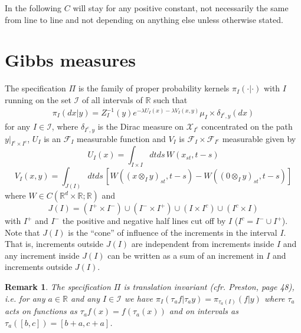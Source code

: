\documentclass[a4paper,12pt,reqno]{amsart}
\newtheorem{remark}[theorem]{Remark}
\newcommand{\R}{\mathbb{R}}
\newcommand{\I}{\mathcal{I}}
\newcommand{\X}{\mathcal{X}}
\newcommand{\F}{\mathcal{F}}
\begin{document}
In the following $C$ will stay for any positive constant, not necessarily the same from line to line and not depending on anything else unless otherwise stated.


\section{Gibbs measures}
\label{sec:existence}
The specification $\Pi$ is the family of proper probability kernels
$\pi_I(\cdot|\cdot)$ with $I$ running on the set $\I$ of all intervals of $\R$ such
that
\begin{equation}
  \begin{split}
\pi_I(dx|y) = Z_{I}^{-1}(y) e^{-\lambda U_{I}(x) -\lambda V_{I}(x,y)} \mu_I\times \delta_{I^c,y}(dx)   
  \end{split}
\end{equation}
for any $I \in \I$,
where $\delta_{I^c,y}$ is the Dirac measure on $\X_{I^c}$
concentrated on the path $y|_{I^c\times I^c}$, $U_I$ is an $\F_I$
measurable function and $V_I$ is $\F_I \times \F_{I^c}$ measurable
given by
\begin{equation}
\label{eq:def-U}
U_I(x) = \int_{I\times I} dt  ds \, W(x_{st},t-s)  
\end{equation}
\begin{equation}
\label{eq:def-V}
V_I(x,y) = \int_{J(I)} dt ds \, [W((x \otimes_I y)_{st},t-s) -W((0 \otimes_I y)_{st},t-s) ] 
\end{equation}
where $W \in C(\R^d\times \R ; \R)$ and
\begin{equation}
  \label{eq:cone}
J(I) = (I^+ \times I^-) \cup (I^- \times I^+) \cup (I \times I^c) \cup (I^c \times I)
\end{equation}
with $I^+$ and $I^-$ the positive and negative half lines cut off by
$I$ ($I^c = I^- \cup I^+$). Note that $J(I)$ is the ``cone'' of
influence of the increments in the interval $I$. That is, increments
outside $J(I)$ are independent from increments inside $I$ and any
increment inside $J(I)$ can be written as a sum of an increment in $I$
and increments outside $J(I)$.

\begin{remark}
  The specification $\Pi$ is translation invariant
  (cfr. Preston\cite{Preston}, page 48), i.e. for any $a\in\R$ and any
  $I \in \mathcal{I}$ we have $\pi_I(\tau_a f| \tau_a y) =
  \pi_{\tau_a(I)}(f|y)$ where $\tau_a$ acts on functions as $\tau_a f
  (x) = f(\tau_a(x))$ and on intervals as $\tau_a([b,c]) = [b+a,c+a]$.
\end{remark}
\end{document}
